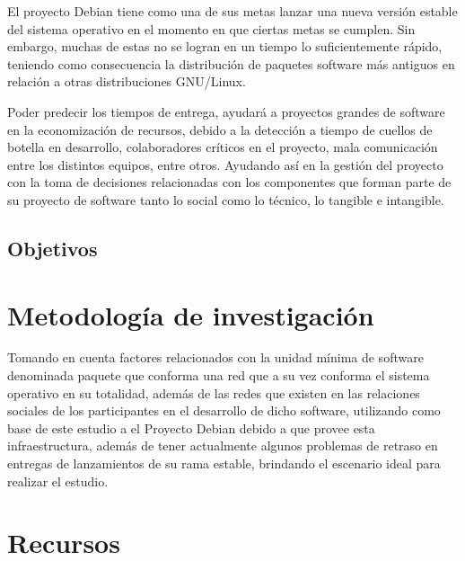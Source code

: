 \documentclass[12pt]{report}
\begin{document}
El proyecto Debian tiene como una de sus metas lanzar 
una  nueva versión estable del  sistema operativo en  el momento en  
que ciertas  metas se cumplen. Sin embargo, muchas de estas no se 
logran en un tiempo lo suficientemente rápido, teniendo como 
consecuencia la distribución de paquetes software más antiguos en 
relación a  otras distribuciones GNU/Linux.

Poder predecir los tiempos de  entrega, ayudará a proyectos grandes de
software  en la  economización de  recursos, debido  a la  detección a
tiempo de cuellos de botella  en desarrollo, colaboradores críticos en
el  proyecto, mala  comunicación  entre los  distintos equipos,  entre
otros.  Ayudando  así en  la  gestión  del  proyecto  con la  toma  de
decisiones relacionadas  con los  componentes que  forman parte  de su
proyecto de  software tanto lo social  como lo técnico, lo  tangible e
intangible.

\section*{Objetivos}


\chapter*{Metodología de investigación}
Tomando en  cuenta factores
relacionados con la  unidad mínima de software  denominada paquete que
conforma una red que  a su vez conforma el sistema operativo
en su  totalidad, además de  las redes  que existen en  las relaciones
sociales de los  participantes en el desarrollo de  dicho software, 
utilizando como base de este estudio  a el Proyecto Debian debido a 
que provee  esta  infraestructura,  además de  tener  actualmente  
algunos problemas de retraso  en entregas de lanzamientos de  su rama 
estable, brindando el escenario ideal para realizar el estudio.

\chapter*{Recursos}
\end{document}

